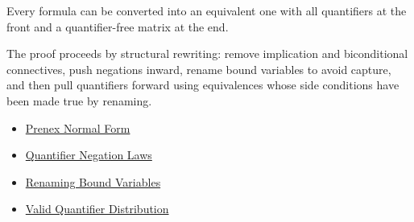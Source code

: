 \begin{remark*}[Interpretation]
Every formula can be converted into an equivalent one with all quantifiers at
the front and a quantifier-free matrix at the end.
\end{remark*}

\begin{remark*}[Exposition]
The proof proceeds by structural rewriting: remove implication and
biconditional connectives, push negations inward, rename bound variables to
avoid capture, and then pull quantifiers forward using equivalences whose side
conditions have been made true by renaming.
\end{remark*}

\begin{dependencies}
\begin{itemize}
  \item \hyperref[def:pnf]{Prenex Normal Form}
  \item \hyperref[thm:qneg]{Quantifier Negation Laws}
  \item \hyperref[thm:rename]{Renaming Bound Variables}
  \item \hyperref[thm:qdist]{Valid Quantifier Distribution}
\end{itemize}
\end{dependencies}
